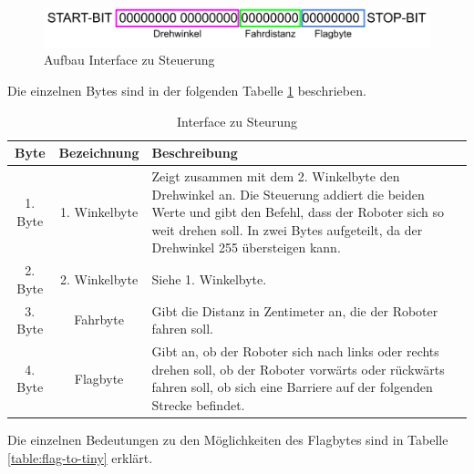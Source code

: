 \begin{figure}[H]
\centering
\includegraphics[width=\textwidth]{assets/IT/interface-tiny.png}
\caption{Aufbau Interface zu Steuerung}
\label{fig:interface-tiny}
\end{figure}

Die einzelnen Bytes sind in der folgenden Tabelle \ref{table:interface-to-tiny} beschrieben.

\begin{table}[H]
\centering
\small
\begin{tabularx}{\textwidth}{|c|c|X|}
\hline
  \textbf{Byte} &\textbf{Bezeichnung} & \textbf{Beschreibung}\\
  \hline
      1. Byte&1. Winkelbyte &Zeigt zusammen mit dem 2. Winkelbyte den Drehwinkel an. Die Steuerung addiert die beiden Werte und gibt den Befehl, dass der Roboter sich so weit drehen soll. In zwei Bytes aufgeteilt, da der Drehwinkel 255 übersteigen kann.\\
  \hline
2. Byte&2. Winkelbyte&Siehe 1. Winkelbyte.\\
  \hline
  3. Byte&Fahrbyte&Gibt die Distanz in Zentimeter an, die der Roboter fahren soll.\\
  \hline
  4. Byte&Flagbyte&Gibt an, ob der Roboter sich nach links oder rechts drehen soll, ob der Roboter vorwärts oder rückwärts fahren soll, ob sich eine Barriere auf der folgenden Strecke befindet.\\
  \hline
  \end{tabularx}
\caption{Interface zu Steurung}
\label{table:interface-to-tiny}
\end{table}

Die einzelnen Bedeutungen zu den Möglichkeiten des Flagbytes sind in Tabelle \ref{table:flag-to-tiny} erklärt.

